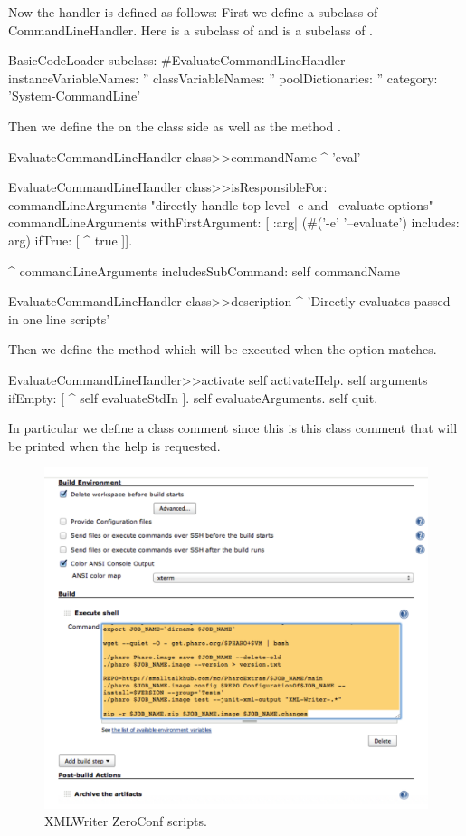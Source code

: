 \documentclass[a4paper,10pt,twoside]{book}
\begin{document}
Now the handler is defined as follows: First we define a subclass of CommandLineHandler. Here 
 is a subclass of  and  is a subclass of \mbox{.}

\begin{code}{}
BasicCodeLoader subclass: #EvaluateCommandLineHandler
	instanceVariableNames: ''
	classVariableNames: ''
	poolDictionaries: ''
	category: 'System-CommandLine'
\end{code}

Then we define the  on the class side as well as the method .

\begin{code}{}
EvaluateCommandLineHandler class>>commandName
	^ 'eval'

EvaluateCommandLineHandler class>>isResponsibleFor: commandLineArguments
	"directly handle top-level -e and --evaluate options"
	commandLineArguments withFirstArgument: [ :arg| 
		(#('-e' '--evaluate') includes: arg)
			ifTrue: [ ^ true ]].
	
	^ commandLineArguments includesSubCommand: self commandName

EvaluateCommandLineHandler class>>description
	^ 'Directly evaluates passed in one line scripts'
\end{code}

Then we define the method  which will be executed when the option matches. 
\begin{code}{}
EvaluateCommandLineHandler>>activate
	self activateHelp.
	self arguments ifEmpty: [ ^ self evaluateStdIn ].
	self evaluateArguments.
	self quit.
\end{code}

In particular we define a class comment since this is this class comment that will be printed when the help is requested. 

\begin{figure}[!h]
	\centering
	\includegraphics[width=\textwidth]{Jenkins}
	\caption{XMLWriter ZeroConf scripts. \label{fig:jenkins}}
\end{figure}
\end{document}
